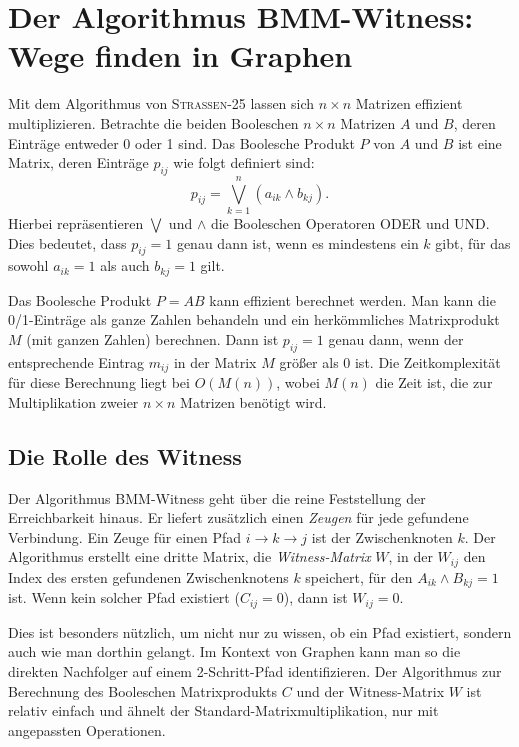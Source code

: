 \documentclass{scrartcl}
\numberwithin{equation}{section}
\begin{document}
\section{Der Algorithmus BMM-Witness: Wege finden in Graphen}
Mit dem Algorithmus von \textsc{Strassen-25} lassen sich $n \times n$ Matrizen effizient multiplizieren. Betrachte die beiden Booleschen $n \times n$ Matrizen $A$ und $B$, deren Einträge entweder 0 oder 1 sind. Das Boolesche Produkt $P$ von $A$ und $B$ ist eine Matrix, deren Einträge $p_{ij}$ wie folgt definiert sind:
$$p_{ij}=\bigvee_{k=1}^{n}(a_{ik}\wedge b_{kj}).$$
Hierbei repräsentieren $\bigvee$ und $\wedge$ die Booleschen Operatoren ODER und UND. Dies bedeutet, dass $p_{ij}=1$ genau dann ist, wenn es mindestens ein $k$ gibt, für das sowohl $a_{ik}=1$ als auch $b_{kj}=1$ gilt.

Das Boolesche Produkt $P=AB$ kann effizient berechnet werden. Man kann die 0/1-Einträge als ganze Zahlen behandeln und ein herkömmliches Matrixprodukt $M$ (mit ganzen Zahlen) berechnen. Dann ist $p_{ij}=1$ genau dann, wenn der entsprechende Eintrag $m_{ij}$ in der Matrix $M$ größer als 0 ist. Die Zeitkomplexität für diese Berechnung liegt bei $O(M(n))$, wobei $M(n)$ die Zeit ist, die zur Multiplikation zweier $n \times n$ Matrizen benötigt wird.

\subsection{Die Rolle des Witness}
Der Algorithmus BMM-Witness geht über die reine Feststellung der Erreichbarkeit hinaus. Er liefert zusätzlich einen \textit{Zeugen} für jede gefundene Verbindung. Ein Zeuge für einen Pfad $i \to k \to j$ ist der Zwischenknoten $k$. Der Algorithmus erstellt eine dritte Matrix, die \textit{Witness-Matrix} $W$, in der $W_{ij}$ den Index des ersten gefundenen Zwischenknotens $k$ speichert, für den $A_{ik} \land B_{kj} = 1$ ist. Wenn kein solcher Pfad existiert ($C_{ij} = 0$), dann ist $W_{ij} = 0$.

Dies ist besonders nützlich, um nicht nur zu wissen, ob ein Pfad existiert, sondern auch wie man dorthin gelangt. Im Kontext von Graphen kann man so die direkten Nachfolger auf einem 2-Schritt-Pfad identifizieren. Der Algorithmus zur Berechnung des Booleschen Matrixprodukts $C$ und der Witness-Matrix $W$ ist relativ einfach und ähnelt der Standard-Matrixmultiplikation, nur mit angepassten Operationen.
\end{document}
